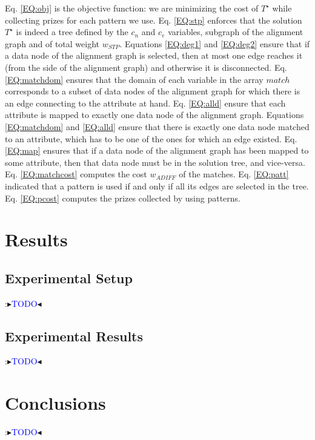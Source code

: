 \documentclass[letterpaper]{article} %
\newcommand{\authornote}[3]{
  {\fbox{\sc 
  #1}:$\blacktriangleright$\textcolor{#2}{\small{#3}}$\blacktriangleleft$}%
}
\newcommand{\ddg}[1]{\authornote{DDG}{blue}{#1}}
\begin{document}
Eq. \ref{EQ:obj} is the objective function: we are minimizing the cost 
of $T^\star$ while collecting prizes for each pattern we use. Eq. \ref{EQ:stp} 
enforces that the solution 
$T^\star$ is indeed a tree defined by the $c_n$ and $c_e$ variables, subgraph 
of the alignment graph 
and of total weight $w_{STP}$. Equations \ref{EQ:deg1} and \ref{EQ:deg2} ensure 
that if a data node of the alignment graph is selected, then at most one edge 
reaches it (from the side of the alignment graph) and otherwise it is 
disconnected. Eq. \ref{EQ:matchdom} ensures that the domain of each variable in 
the array $match$ corresponds to a subset of data nodes of the alignment graph 
for which there is an edge connecting to the attribute at hand. Eq. 
\ref{EQ:alld} ensure that each attribute is mapped to exactly one data node of 
the alignment graph. Equations \ref{EQ:matchdom} and \ref{EQ:alld} ensure that 
there is exactly one data node matched to an attribute, which has to be one of 
the ones for which an edge existed. Eq. \ref{EQ:map} ensures that 
if a data node of the alignment graph has been mapped to some attribute, then 
that data node must be in the solution tree, and vice-versa. Eq. 
\ref{EQ:matchcost} computes the cost $w_{ADIFF}$ of the matches.
Eq. \ref{EQ:patt} indicated that a pattern is used if and only if all its edges 
are selected in the tree. Eq. \ref{EQ:pcost} computes the prizes collected by 
using patterns.

\section{Results \label{SEC:Res}}

\subsection{Experimental Setup}
\ddg{TODO}

\subsection{Experimental Results}
\ddg{TODO}

\section{Conclusions}
\ddg{TODO} 




\end{document}

